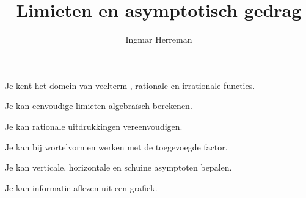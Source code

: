 \documentclass{ximera}
\title{Limieten en asymptotisch gedrag}
\author{Ingmar Herreman}
\begin{document}

















































































\maketitle



\begin{voorkennis}
    \item Je kent het domein van veelterm-, rationale en irrationale functies.
    \item Je kan eenvoudige limieten algebraïsch berekenen.
    \item Je kan rationale uitdrukkingen vereenvoudigen.
    \item Je kan bij wortelvormen werken met de toegevoegde factor.
    \item Je kan verticale, horizontale en schuine asymptoten bepalen.
    \item Je kan informatie aflezen uit een grafiek.
  \end{voorkennis}
  
\end{document}
